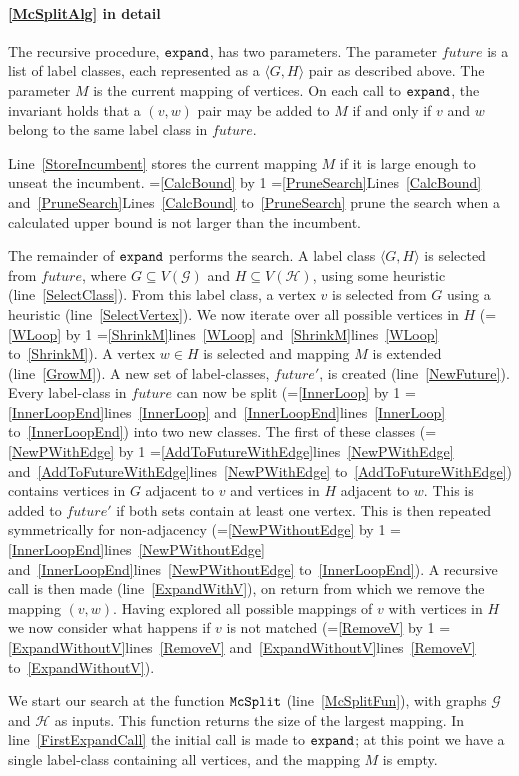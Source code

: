 \documentclass[letterpaper]{article}
\newcommand{\AlgVar}[1]{\mathit{#1}}
\newcommand{\graphG}{\mathcal{G}}
\newcommand{\graphH}{\mathcal{H}}
\newcommand{\setG}{G}
\newcommand{\setH}{H}
\newcommand{\lineref}[1]{line~\ref{#1}}
\newcommand{\linerangeref}[2]{\count255=\ref{#1}\advance\count255 by 1 \ifnum\count255=\ref{#2}lines~\ref{#1} and~\ref{#2}\else lines~\ref{#1} to~\ref{#2}\fi}
\newcommand{\Lineref}[1]{Line~\ref{#1}}
\newcommand{\Linerangeref}[2]{\count255=\ref{#1}\advance\count255 by 1 \ifnum\count255=\ref{#2}Lines~\ref{#1} and~\ref{#2}\else Lines~\ref{#1} to~\ref{#2}\fi}
\begin{document}
\paragraph{\cref{McSplitAlg} in detail} The recursive procedure,
$\FuncSty{expand}$, has two parameters.  The parameter $\AlgVar{future}$ is a
list of label classes, each represented as a $\langle \setG, \setH \rangle$ pair as
described above.  The parameter $M$ is the current mapping of vertices.  On
each call to $\FuncSty{expand}$, the invariant holds that a $(v,w)$ pair may be
added to $M$ if and only if $v$ and $w$ belong to the same label class in
$\AlgVar{future}$.

\Lineref{StoreIncumbent} stores the current mapping $M$ if it is large enough
to unseat the incumbent.  \Linerangeref{CalcBound}{PruneSearch} prune the
search when a calculated upper bound is not larger than the incumbent.

The remainder of $\FuncSty{expand}$ performs the search.  A label class
$\langle \setG, \setH \rangle$ is selected from $\AlgVar{future}$, where $\setG \subseteq
V(\graphG)$ and $\setH \subseteq V(\graphH)$, using some heuristic (\lineref{SelectClass}).
From this label class, a vertex $v$ is selected from $\setG$ using a heuristic
(\lineref{SelectVertex}). We now iterate over all possible vertices in $\setH$
(\linerangeref{WLoop}{ShrinkM}). A vertex $w \in \setH$ is selected and mapping $M$
is extended (\lineref{GrowM}). A new set of label-classes, $\AlgVar{future'}$,
is created (\lineref{NewFuture}).  Every label-class in $\AlgVar{future}$ can
now be split (\linerangeref{InnerLoop}{InnerLoopEnd}) into two new classes. The
first of these classes (\linerangeref{NewPWithEdge}{AddToFutureWithEdge})
contains vertices in $\setG$ adjacent to $v$ and vertices in $\setH$ adjacent to $w$.
This is added to $\AlgVar{future'}$ if both sets contain at least one vertex.
This is then repeated symmetrically for non-adjacency
(\linerangeref{NewPWithoutEdge}{InnerLoopEnd}). A recursive call is then made
(\lineref{ExpandWithV}), on return from which we remove the mapping $(v,w)$.
Having explored all possible mappings of $v$ with vertices in $\setH$ we now
consider what happens if $v$ is not matched
(\linerangeref{RemoveV}{ExpandWithoutV}).

We start our search at the function $\FuncSty{McSplit}$ (\lineref{McSplitFun}),
with graphs $\graphG$ and $\graphH$ as inputs.  This function returns the size of the
largest mapping.  In \lineref{FirstExpandCall} the initial call is made to
$\FuncSty{expand}$; at this point we have a single label-class containing all
vertices, and the mapping $M$ is empty.
\end{document}
